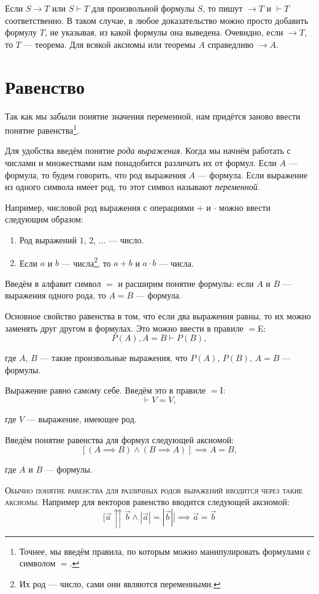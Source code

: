 Если $S\to T$ или $S\vdash T$ для произвольной формулы $S$,
то пишут $\to T$ и $\vdash T$ соответственно. В таком случае,
в любое доказательство можно просто добавить формулу $T$,
не указывая, из какой формулы она выведена. Очевидно,
если $\to T$, то $T$ --- теорема. Для всякой аксиомы или теоремы $A$
справедливо $\to A$.

\section{Равенство}

Так как мы забыли понятие значения переменной,
нам придётся заново ввести понятие равенства\footnote{
	Точнее, мы введём правила, по которым можно манипулировать
	формулами с символом $=$.
}.

Для удобства введём понятие {\it рода выражения}. Когда мы начнём работать с числами
и множествами нам понадобится различать их от формул. Если $A$ --- формула,
то будем говорить, что род выражения $A$ --- формула. Если выражение из одного
символа имеет род, то этот символ называют {\it переменной}.

Например, числовой род выражения с операциями $+$ и $\cdot$
можно ввести следующим образом:
\begin{enumerate}
	\item{}Род выражений $1$, $2$, ... --- число.
	\item{}Если $a$ и $b$ --- числа\footnote{Их род --- число,
		сами они являются переменными.}, то
	$a+b$ и $a\cdot b$ --- числа.
\end{enumerate}

Введём в алфавит символ $=$ и расширим понятие формулы: если $A$ и $B$ --- выражения
одного рода, то $A=B$ --- формула.

Основное свойство равенства в том, что если два выражения равны, то их можно
заменять друг другом в формулах. Это можно ввести в правиле $=$E:
\[
	P(A),A=B\vdash P(B),
\]

где $A$, $B$ --- такие произвольные выражения, что $P(A)$, $P(B)$, $A=B$ --- формулы.

Выражение равно самому себе. Введём это в правиле $=$I:
\[
	\vdash V=V,
\]

где $V$ --- выражение, имеющее род.

Введём понятие равенства для формул следующей аксиомой:
\[
	[(A\implies B)\land (B\implies A)]\implies A=B,
\]

где $A$ и $B$ --- формулы.

\textsc{Обычно понятие равенства для различных родов выражений
	вводится через такие аксиомы.}
Например для векторов равенство вводится следующей аксиомой:
\[
	\big[\vec{a}\upuparrows\vec{b}\land|\vec{a}|=|\vec{b}|\big]
	\implies \vec{a}=\vec{b}
\]

